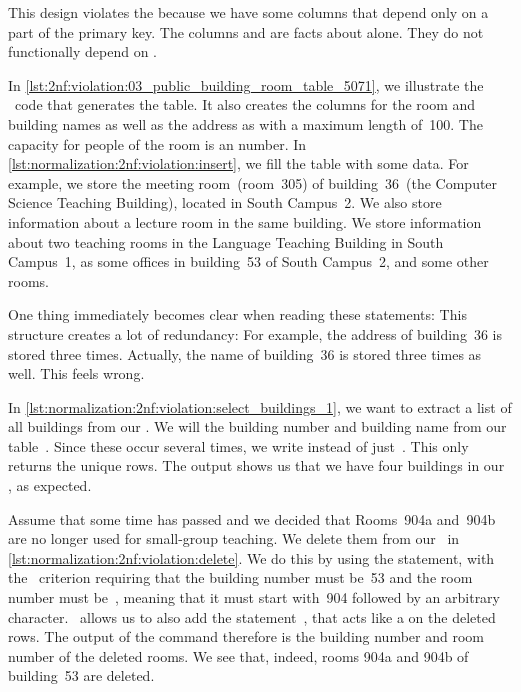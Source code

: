 This design violates the  because we have some columns that depend only on a part of the primary key.
The columns  and  are facts about  alone.
They do not functionally depend on .

In \cref{lst:2nf:violation:03_public_building_room_table_5071}, we illustrate the \sql\ code that generates the table.
It also creates the columns for the room and building names as well as the address as  with a maximum length of~100.
The capacity for people of the room is an  number.
In \cref{lst:normalization:2nf:violation:insert}, we fill the table with some data.
For example, we store the meeting room~(room~305) of building~36~(the Computer Science Teaching Building), located in South Campus~2.
We also store information about a lecture room in the same building.
We store information about two teaching rooms in the Language Teaching Building in South Campus~1, as some offices in building~53 of South Campus~2, and some other rooms.

One thing immediately becomes clear when reading these  statements:
This structure creates a lot of redundancy:
For example, the address of building~36 is stored three times.
Actually, the name of building~36 is stored three times as well.
This feels wrong.

In \cref{lst:normalization:2nf:violation:select_buildings_1}, we want to extract a list of all buildings from our \db.
We will  the building number and building name from our table~.
Since these occur several times, we write  instead of just~.
This only returns the unique rows.
The output shows us that we have four buildings in our \db, as expected.

Assume that some time has passed and we decided that Rooms~904a and~904b are no longer used for small-group teaching.
We delete them from our \db\ in \cref{lst:normalization:2nf:violation:delete}.
We do this by using the  statement, with the~ criterion requiring that the building number must be~53 and the room number must be~, meaning that it must start with~904 followed by an arbitrary character.
\postgresql\ allows us to also add the  statement~\cite{PGDG:PD:RDFMR}, that acts like a  on the deleted rows.
The output of the command therefore is the building number and room number of the deleted rooms.
We see that, indeed, rooms 904a and 904b of building~53 are deleted.

